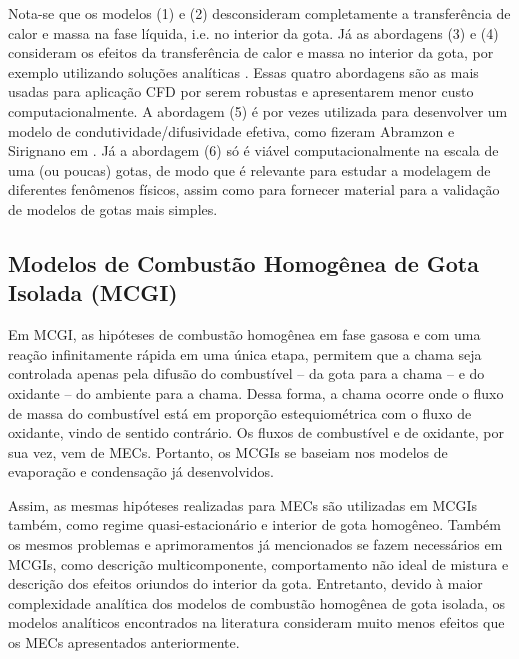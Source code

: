 Nota-se que os modelos (1) e (2) desconsideram completamente a transferência de calor e massa na fase líquida, i.e. no interior da gota.
Já as abordagens (3) e (4) consideram os efeitos da transferência de calor e massa no interior da gota, por exemplo utilizando soluções analíticas \cite{ZanuttoC2019}.
Essas quatro abordagens são as mais usadas para aplicação CFD por serem robustas e apresentarem menor custo computacionalmente. 
A abordagem (5) é por vezes utilizada para desenvolver um modelo de condutividade/difusividade efetiva, como fizeram Abramzon e Sirignano em \cite{Sirignano1989}.
Já a abordagem (6) só é viável computacionalmente na escala de uma (ou poucas) gotas, de modo que é relevante para estudar a modelagem de diferentes fenômenos físicos, assim como para fornecer material para a validação de modelos de gotas mais simples.




\subsection{Modelos de Combustão Homogênea de Gota Isolada (MCGI)} \label{sec:MCGI}

Em MCGI, as hipóteses de combustão homogênea em fase gasosa e com uma reação infinitamente rápida em uma única etapa, permitem que a chama seja controlada apenas pela difusão do combustível -- da gota para a chama -- e do oxidante -- do ambiente para a chama.
Dessa forma, a chama ocorre onde o fluxo de massa do combustível está em proporção estequiométrica com o fluxo de oxidante, vindo de sentido contrário. 
Os fluxos de combustível e de oxidante, por sua vez, vem de MECs.
Portanto, os MCGIs se baseiam nos modelos de evaporação e condensação já desenvolvidos.

Assim, as mesmas hipóteses realizadas para MECs são utilizadas em MCGIs também, como regime quasi-estacionário e interior de gota homogêneo.
Também os mesmos problemas e aprimoramentos já mencionados se fazem necessários em MCGIs, como descrição multicomponente, comportamento não ideal de mistura e  
descrição dos efeitos oriundos do interior da gota.
Entretanto, devido à maior complexidade analítica dos modelos de combustão homogênea de gota isolada, os modelos analíticos encontrados na literatura consideram muito menos efeitos que os MECs apresentados anteriormente.

